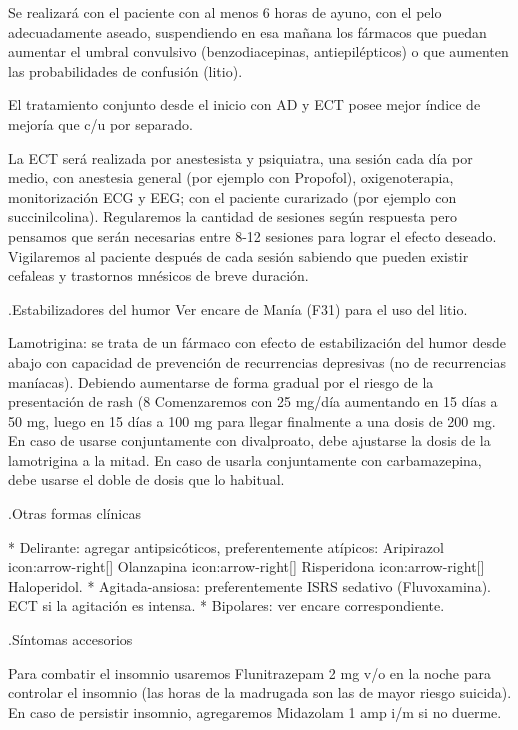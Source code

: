 \documentclass[encares.tex]{subfiles}
\begin{document}
Se realizará con el paciente con al menos 6 horas de ayuno, con el pelo adecuadamente aseado, suspendiendo en esa mañana los fármacos que puedan aumentar el umbral convulsivo (benzodiacepinas, antiepilépticos) o que aumenten las probabilidades de confusión (litio).

El tratamiento conjunto desde el inicio con AD y ECT posee mejor índice de mejoría que c/u por separado.

La ECT será realizada por anestesista y psiquiatra, una sesión cada día por medio, con anestesia general (por ejemplo con Propofol), oxigenoterapia, monitorización ECG y EEG; con el paciente curarizado (por ejemplo con succinilcolina). Regularemos la cantidad de sesiones según respuesta pero pensamos que serán necesarias entre 8-12 sesiones para lograr el efecto deseado. Vigilaremos al paciente después de cada sesión sabiendo que pueden existir cefaleas y trastornos mnésicos de breve duración.

.Estabilizadores del humor
Ver encare de Manía (F31) para el uso del litio.

Lamotrigina: se trata de un fármaco con efecto de estabilización del humor desde abajo con capacidad de prevención de recurrencias depresivas (no de recurrencias maníacas). Debiendo aumentarse de forma gradual por el riesgo de la presentación de rash (8%
Comenzaremos con 25 mg/día aumentando en 15 días a 50 mg, luego en 15 días a 100 mg para llegar finalmente a una dosis de 200 mg. En caso de usarse conjuntamente con divalproato, debe ajustarse la dosis de la lamotrigina a la mitad. En caso de usarla conjuntamente con carbamazepina, debe usarse el doble de dosis que lo habitual.

.Otras formas clínicas

* Delirante: agregar antipsicóticos, preferentemente atípicos: Aripirazol icon:arrow-right[] Olanzapina icon:arrow-right[] Risperidona icon:arrow-right[] Haloperidol.
* Agitada-ansiosa: preferentemente ISRS sedativo (Fluvoxamina). ECT si la agitación es intensa.
* Bipolares: ver encare correspondiente.

.Síntomas accesorios

Para combatir el insomnio usaremos Flunitrazepam 2 mg v/o en la noche para controlar el insomnio (las horas de la madrugada son las de mayor riesgo suicida). En caso de persistir insomnio, agregaremos Midazolam 1 amp i/m si no duerme.
\end{document}
